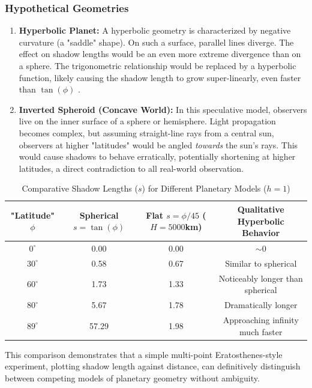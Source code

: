 \documentclass[11pt]{article}
\begin{document}
\subsubsection{Hypothetical Geometries}
\begin{enumerate}
    \item  \textbf{Hyperbolic Planet:} A hyperbolic geometry is characterized by negative curvature (a "saddle" shape). On such a surface, parallel lines diverge. The effect on shadow lengths would be an even more extreme divergence than on a sphere. The trigonometric relationship would be replaced by a hyperbolic function, likely causing the shadow length to grow super-linearly, even faster than $\tan(\phi)$ \cite{Richards1997}.
    \item  \textbf{Inverted Spheroid (Concave World):} In this speculative model, observers live on the inner surface of a sphere or hemisphere. Light propagation becomes complex, but assuming straight-line rays from a central sun, observers at higher "latitudes" would be angled \textit{towards} the sun's rays. This would cause shadows to behave erratically, potentially shortening at higher latitudes, a direct contradiction to all real-world observation.
\end{enumerate}

\begin{table}[htbp]
\centering
\caption{Comparative Shadow Lengths ($s$) for Different Planetary Models ($h=1$)}
\label{tab:model_comparison}
\small
\begin{tabular}{@{}cccc@{}}
\toprule
\textbf{"Latitude" $\phi$} & \textbf{Spherical $s = \tan(\phi)$} & \textbf{Flat $s = \phi/45$ ($H=5000$km)} & \textbf{Qualitative Hyperbolic Behavior} \\
\midrule
\textbf{$0^{\circ}$} & 0.00 & 0.00 & $\sim$0 \\
\textbf{$30^{\circ}$} & 0.58 & 0.67 & Similar to spherical \\
\textbf{$60^{\circ}$} & 1.73 & 1.33 & Noticeably longer than spherical \\
\textbf{$80^{\circ}$} & 5.67 & 1.78 & Dramatically longer \\
\textbf{$89^{\circ}$} & 57.29 & 1.98 & Approaching infinity much faster \\
\bottomrule
\end{tabular}
\end{table}

This comparison demonstrates that a simple multi-point Eratosthenes-style experiment, plotting shadow length against distance, can definitively distinguish between competing models of planetary geometry without ambiguity.
\end{document}
